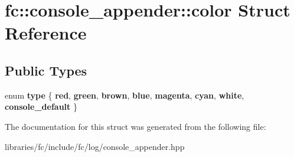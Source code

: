 \hypertarget{structfc_1_1console__appender_1_1color}{}\section{fc\+:\+:console\+\_\+appender\+:\+:color Struct Reference}
\label{structfc_1_1console__appender_1_1color}
\subsection*{Public Types}
\begin{DoxyCompactItemize}
\item 
\mbox{\label{structfc_1_1console__appender_1_1color_ae3f964a317f52c91550bd98bb4e4402d}} 
enum {\bfseries type} \{ \newline
{\bfseries red}, 
{\bfseries green}, 
{\bfseries brown}, 
{\bfseries blue}, 
\newline
{\bfseries magenta}, 
{\bfseries cyan}, 
{\bfseries white}, 
{\bfseries console\+\_\+default}
 \}
\end{DoxyCompactItemize}


The documentation for this struct was generated from the following file\+:\begin{DoxyCompactItemize}
\item 
libraries/fc/include/fc/log/console\+\_\+appender.\+hpp\end{DoxyCompactItemize}

